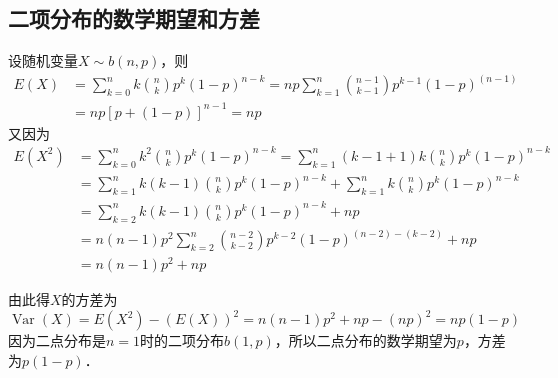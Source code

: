 \subsection{二项分布的数学期望和方差}

设随机变量$X\sim b(n,p)$，则
\begin{equation}
\begin{aligned} E(X) &=\sum_{k=0}^{n} k\binom{n}{k} p^{k}(1-p)^{n-k}=n p \sum_{k=1}^{n}\binom{n-1}{k-1} p^{k-1}(1-p)^{(n-1)} \\ &=n p[p+(1-p)]^{n-1}=n p \end{aligned}
\end{equation}
又因为
\begin{equation}
\begin{aligned} E\left(X^{2}\right) &=\sum_{k=0}^{n} k^{2}\binom{n}{k} p^{k}(1-p)^{n-k}=\sum_{k=1}^{n}(k-1+1) k\binom{n}{k} p^{k}(1-p)^{n-k} \\ &=\sum_{k=1}^{n} k(k-1)\binom{n}{k} p^{k}(1-p)^{n-k}+\sum_{k=1}^{n} k\binom{n}{k} p^{k}(1-p)^{n-k} \\ &=\sum_{k=2}^{n} k(k-1)\binom{n}{k} p^{k}(1-p)^{n-k}+n p \\ &=n(n-1) p^{2} \sum_{k=2}^{n}\binom{n-2}{k-2} p^{k-2}(1-p)^{(n-2)-(k-2)}+n p \\ &=n(n-1) p^{2}+n p \end{aligned}
\end{equation}

由此得$X $的方差为
\begin{equation}
\operatorname{Var}(X)=E\left(X^{2}\right)-(E(X))^{2}=n(n-1) p^{2}+n p-(n p)^{2}=n p(1-p)
\end{equation}
因为二点分布是$n=1$时的二项分布$b(1,p)$，所以二点分布的数学期望为$p$，方差为$p(1-p)$．


